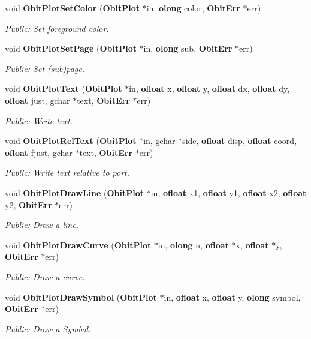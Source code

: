 \begin{CompactItemize}
void {\bf Obit\-Plot\-Set\-Color} ({\bf Obit\-Plot} $\ast$in, {\bf olong} color, {\bf Obit\-Err} $\ast$err)
\begin{CompactList}\small\item\em Public: Set foreground color. \item\end{CompactList}\item 
void {\bf Obit\-Plot\-Set\-Page} ({\bf Obit\-Plot} $\ast$in, {\bf olong} sub, {\bf Obit\-Err} $\ast$err)
\begin{CompactList}\small\item\em Public: Set (sub)page. \item\end{CompactList}\item 
void {\bf Obit\-Plot\-Text} ({\bf Obit\-Plot} $\ast$in, {\bf ofloat} x, {\bf ofloat} y, {\bf ofloat} dx, {\bf ofloat} dy, {\bf ofloat} just, gchar $\ast$text, {\bf Obit\-Err} $\ast$err)
\begin{CompactList}\small\item\em Public: Write text. \item\end{CompactList}\item 
void {\bf Obit\-Plot\-Rel\-Text} ({\bf Obit\-Plot} $\ast$in, gchar $\ast$side, {\bf ofloat} disp, {\bf ofloat} coord, {\bf ofloat} fjust, gchar $\ast$text, {\bf Obit\-Err} $\ast$err)
\begin{CompactList}\small\item\em Public: Write text relative to port. \item\end{CompactList}\item 
void {\bf Obit\-Plot\-Draw\-Line} ({\bf Obit\-Plot} $\ast$in, {\bf ofloat} x1, {\bf ofloat} y1, {\bf ofloat} x2, {\bf ofloat} y2, {\bf Obit\-Err} $\ast$err)
\begin{CompactList}\small\item\em Public: Draw a line. \item\end{CompactList}\item 
void {\bf Obit\-Plot\-Draw\-Curve} ({\bf Obit\-Plot} $\ast$in, {\bf olong} n, {\bf ofloat} $\ast$x, {\bf ofloat} $\ast$y, {\bf Obit\-Err} $\ast$err)
\begin{CompactList}\small\item\em Public: Draw a curve. \item\end{CompactList}\item 
void {\bf Obit\-Plot\-Draw\-Symbol} ({\bf Obit\-Plot} $\ast$in, {\bf ofloat} x, {\bf ofloat} y, {\bf olong} symbol, {\bf Obit\-Err} $\ast$err)
\begin{CompactList}\small\item\em Public: Draw a Symbol. \item\end{CompactList}\end{CompactItemize}


